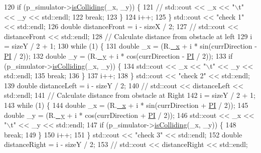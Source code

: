 \begin{DoxyCode}
120     \textcolor{keywordflow}{if} (p\_simulator->\hyperlink{classRobotSimulator_a564d79ead199c034841eda1b3ebebfcd}{isColliding}(\_x, \_y)) \{
121       \textcolor{comment}{//  std::cout << \_x << "\(\backslash\)t" << \_y << std::endl;}
122       \textcolor{keywordflow}{break};
123     \}
124     i++;
125   \} std::cout << \textcolor{stringliteral}{"check 1"} << std::endl;
126   \textcolor{keywordtype}{double} distanceFront = i - sizeX / 2;
127   \textcolor{comment}{//  std::cout << distanceFront << std::endl;}
128   \textcolor{comment}{//  Calculate distance from obstacle at left}
129   i = sizeY / 2 + 1;
130   \textcolor{keywordflow}{while} (1) \{
131     \textcolor{keywordtype}{double} \_x = (R.\hyperlink{structPoint_a77b9bd094b57efb7c185fdb3fb781900}{\_x} + i * sin(currDirection - \hyperlink{Actor_8hpp_a598a3330b3c21701223ee0ca14316eca}{PI} / 2));
132     \textcolor{keywordtype}{double} \_y = (R.\hyperlink{structPoint_aa8be383c30dee092979999b523373658}{\_y} + i * cos(currDirection - \hyperlink{Actor_8hpp_a598a3330b3c21701223ee0ca14316eca}{PI} / 2));
133     \textcolor{keywordflow}{if} (p\_simulator->\hyperlink{classRobotSimulator_a564d79ead199c034841eda1b3ebebfcd}{isColliding}(\_x, \_y)) \{
134       std::cout << \_x << \textcolor{stringliteral}{"\(\backslash\)t"} << \_y << std::endl;
135       \textcolor{keywordflow}{break};
136     \}
137     i++;
138   \} std::cout << \textcolor{stringliteral}{"check 2"} << std::endl;
139   \textcolor{keywordtype}{double} distanceLeft = i - sizeY / 2;
140   \textcolor{comment}{//  std::cout << distanceLeft << std::endl;}
141   \textcolor{comment}{//  Calculate distance from obstacle at Right}
142   i = sizeY / 2 + 1;
143   \textcolor{keywordflow}{while} (1) \{
144     \textcolor{keywordtype}{double} \_x = (R.\hyperlink{structPoint_a77b9bd094b57efb7c185fdb3fb781900}{\_x} + i * sin(currDirection + \hyperlink{Actor_8hpp_a598a3330b3c21701223ee0ca14316eca}{PI} / 2));
145     \textcolor{keywordtype}{double} \_y = (R.\hyperlink{structPoint_aa8be383c30dee092979999b523373658}{\_y} + i * cos(currDirection + \hyperlink{Actor_8hpp_a598a3330b3c21701223ee0ca14316eca}{PI} / 2));
146     std::cout << \_x << \textcolor{stringliteral}{"\(\backslash\)t"} << \_y << std::endl;
147     \textcolor{keywordflow}{if} (p\_simulator->\hyperlink{classRobotSimulator_a564d79ead199c034841eda1b3ebebfcd}{isColliding}(\_x, \_y)) \{
148       \textcolor{keywordflow}{break};
149     \}
150     i++;
151   \} std::cout << \textcolor{stringliteral}{"check 3"} << std::endl;
152   \textcolor{keywordtype}{double} distanceRight = i - sizeY / 2;
153   \textcolor{comment}{//  std::cout << distanceRight << std::endl;}

\end{DoxyCode}
